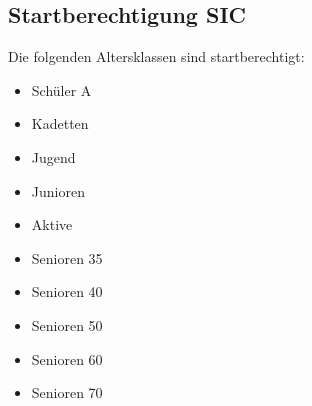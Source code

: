 \subsection{Startberechtigung SIC}
Die folgenden Altersklassen sind startberechtigt:
\begin{itemize}
	\item Schüler A
	\item Kadetten
	\item Jugend
	\item Junioren
	\item Aktive
	\item Senioren 35
	\item Senioren 40
	\item Senioren 50
	\item Senioren 60
	\item Senioren 70
\end{itemize}